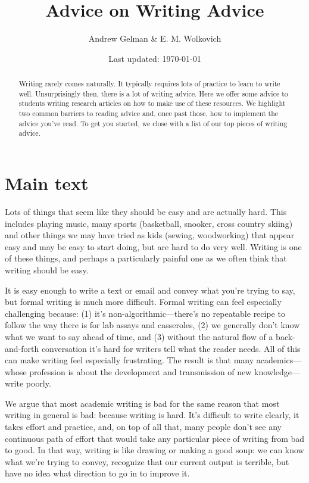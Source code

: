 \documentclass[11pt,letter]{article}
\begin{document}


\title{Advice on Writing Advice}
\author{Andrew Gelman  \& E. M. Wolkovich}
\date{Last updated: \today}
\maketitle

\begin{abstract}
Writing rarely comes naturally. It typically requires lots of practice to learn to write well.  Unsurprisingly then, there is a lot of writing advice. Here we offer some advice to students writing research articles on how to make use of these resources. We highlight two common barriers to reading advice and, once past those, how to implement the advice you've read. To get you started, we close with a list of our top pieces of writing advice. 
\end{abstract}

\section{Main text} %

Lots of things that seem like they should be easy and are actually hard. This includes playing music, many sports (basketball, snooker, cross country skiing) and other things we may have tried as kids (sewing, woodworking) that appear easy and may be easy to start doing, but are hard to do very well. Writing is one of these things, and perhaps a particularly painful one as we often think that writing should be easy. 

It is easy enough to write a text or email and convey what you’re trying to say, but formal writing is much more difficult. Formal writing can feel especially challenging because: (1) it's non-algorithmic---there's no repeatable recipe to follow the way there is for  lab assays and casseroles, (2) we generally don't know what we want to say ahead of time, and (3) without the natural flow of a back-and-forth conversation it's hard for writers tell what the reader needs. All of this can make writing feel especially frustrating. The result is that many academics---whose profession is about the development and transmission of new knowledge---write poorly. 

We argue that most academic writing is bad for the same reason that most writing in general is bad: because writing is hard.  It’s difficult to write clearly, it takes effort and practice, and, on top of all that, many people don’t see any continuous path of effort that would take any particular piece of writing from bad to good. In that way, writing is like drawing or making a good soup:  we can know what we’re trying to convey, recognize that our current output is terrible, but have no idea what direction to go in to improve it. %
\end{document}
